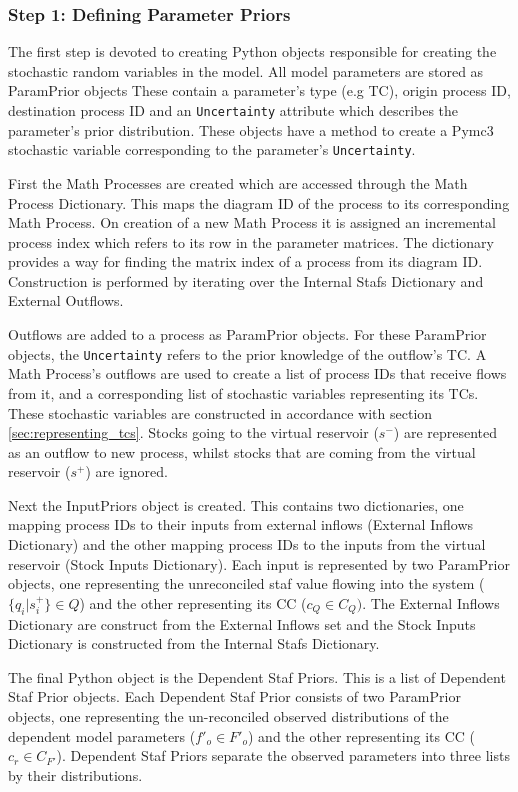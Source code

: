 \documentclass[ %
                    author={Tom Jager},
                supervisor={Dr. Daniel Schien},
                    degree={MEng},
                     title={A Bayesian Inference Engine for Calibrating Uncertainty over UMIS Structured MFA Systems},
                  subtitle={},
                      type={research},
                      year={2019} ]{dissertation}
\begin{document}
\subsubsection{Step 1: Defining Parameter Priors}


The first step is devoted to creating Python objects responsible for creating the stochastic random variables in the model. All model parameters are stored as ParamPrior objects These contain a parameter's type (e.g TC), origin process ID, destination process ID and an \texttt{Uncertainty} attribute which describes the parameter's prior distribution. These objects have a method to create a Pymc3 stochastic variable corresponding to the parameter's \texttt{Uncertainty}.

First the Math Processes are created which are accessed through the Math Process Dictionary. This maps the diagram ID of the process to its corresponding Math Process. On creation of a new Math Process it is assigned an incremental process index which refers to its row in the parameter matrices. The dictionary provides a way for finding the matrix index of a process from its diagram ID. Construction is performed by iterating over the Internal Stafs Dictionary and External Outflows.

Outflows are added to a process as ParamPrior objects. For these ParamPrior objects, the \texttt{Uncertainty} refers to the prior knowledge of the outflow's TC. A Math Process's outflows are used to create a list of process IDs that receive flows from it, and a corresponding list of stochastic variables representing its TCs. These stochastic variables are constructed in accordance with section \ref{sec:representing_tcs}. Stocks going to the virtual reservoir ($s^-$) are represented as an outflow to new process, whilst stocks that are coming from the virtual reservoir ($s^+$) are ignored.

Next the InputPriors object is created. This contains two dictionaries, one mapping process IDs to their inputs from external inflows (External Inflows Dictionary) and the other mapping process IDs to the inputs from the virtual reservoir (Stock Inputs Dictionary). Each input is represented by two ParamPrior objects, one representing the unreconciled staf value flowing into the system ($\{q_i | s^+_i\} \in Q$) and the other representing its CC ($c_Q \in C_Q)$. The External Inflows Dictionary are construct from the External Inflows set and the Stock Inputs Dictionary is constructed from the Internal Stafs Dictionary.

The final Python object is the Dependent Staf Priors. This is a list of Dependent Staf Prior objects. Each Dependent Staf Prior consists of two ParamPrior objects, one representing the un-reconciled observed distributions of the dependent model parameters ($f'_o \in F'_o$) and the other representing its CC ($c_r \in C_{F'}$). Dependent Staf Priors separate the observed parameters into three lists by their distributions.
\end{document}
